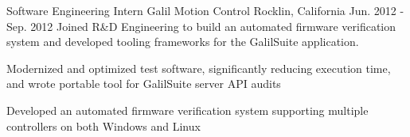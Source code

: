 \begin{cventries}
\cventry
    {Software Engineering Intern} %
    {Galil Motion Control} %
    {Rocklin, California} %
    {Jun. 2012 - Sep. 2012} %
    {Joined R\&D Engineering to build an automated firmware verification system and developed tooling frameworks for the GalilSuite application.} %
    {
      \begin{cvitems} %
        \item {Modernized and optimized test software, significantly reducing execution time, and wrote portable tool for GalilSuite server API audits}
        \item {Developed an automated firmware verification system supporting multiple controllers on both Windows and Linux} 
      \end{cvitems}
    }

\end{cventries}
